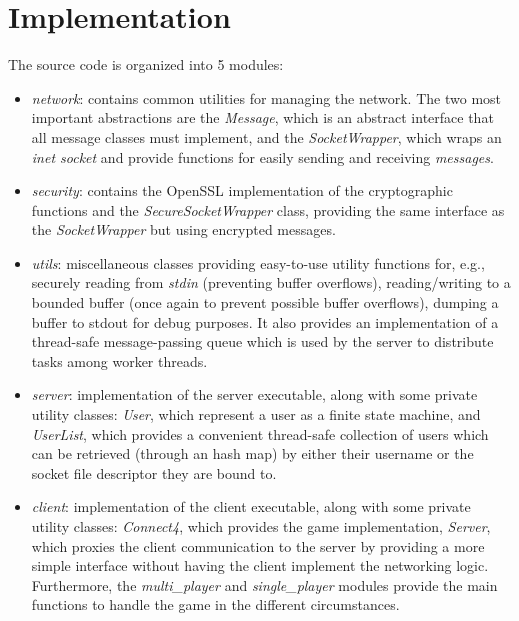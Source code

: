 \section{Implementation}
\label{ref:modules}
The source code is organized into 5 modules:
\begin{itemize}
    \item \emph{network}: contains common utilities for managing the network. 
        The two most important abstractions are the \emph{Message}, which 
        is an abstract interface that all message classes must implement, and 
        the \emph{SocketWrapper}, which wraps an \emph{inet socket} and 
        provide functions for easily sending and receiving \emph{messages}.
    \item \emph{security}: contains the OpenSSL implementation of the 
        cryptographic functions and the \emph{SecureSocketWrapper} class,
        providing the same interface as the \emph{SocketWrapper} but using 
        encrypted messages.
    \item \emph{utils}: miscellaneous classes providing easy-to-use utility 
        functions for, e.g., securely reading from \emph{stdin} (preventing 
        buffer overflows), reading/writing to a bounded buffer (once again 
        to prevent possible buffer overflows), dumping a buffer to stdout 
        for debug purposes. It also provides an implementation of a thread-safe
        message-passing queue which is used by the server to distribute tasks
        among worker threads.
    \item \emph{server}: implementation of the server executable, along with
        some private utility classes: \emph{User}, which represent a user as 
        a finite state machine, and \emph{UserList}, which provides a convenient
        thread-safe collection of users which can be retrieved (through an
        hash map) by either their username or the socket file descriptor they 
        are bound to.
    \item \emph{client}: implementation of the client executable, along with 
        some private utility classes: \emph{Connect4}, which provides the game 
        implementation, \emph{Server}, which proxies the client communication 
        to the server by providing a more simple interface without having the 
        client implement the networking logic. 
        Furthermore, the \emph{multi\_player} and \emph{single\_player} modules 
        provide the main functions to handle the game in the different 
        circumstances.
\end{itemize}

